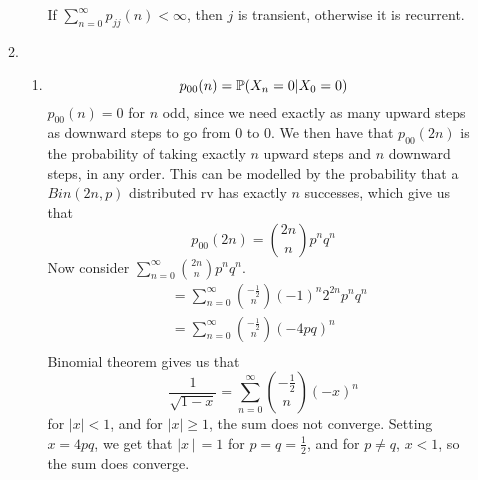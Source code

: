 \documentclass{article}
\begin{document}
\begin{enumerate}
\begin{enumerate}
\begin{enumerate}
If $\sum\limits^\infty_{n=0}p_{jj}(n) < \infty$, then $j$ is transient, otherwise it is recurrent.

\end{enumerate}
\item
\begin{enumerate}
\item
$$
p_{00}(n) = \mathbb{P} (X_n = 0 | X_0 = 0)
$$
$p_{00}(n) = 0$ for $n$ odd, since we need exactly as many upward steps as downward steps to go from $0$ to $0$. We then have that $p_{00}(2n)$ is the probability of taking exactly $n$ upward steps and $n$ downward steps, in any order. This can be modelled by the probability that a $Bin(2n,p)$ distributed rv has exactly $n$ successes, which give us that
$$
p_{00}(2n) = {2n \choose n} p^nq^n
$$
Now consider $\sum\limits^\infty_{n=0}{2n\choose n} p^nq^n$.
\begin{align*}
&= \sum^\infty_{n=0}{-\frac{1}{2}\choose n}(-1)^n 2^{2n} p^n q^n\\
&= \sum^\infty_{n=0}{-\frac{1}{2}\choose n}(-4pq)^n\\
\end{align*}
Binomial theorem gives us that
$$
\frac{1}{\sqrt{1-x}} = \sum^\infty_{n=0}{-\frac{1}{2}\choose n}(-x)^n 
$$
for $|x|<1$, and for $|x|\geqslant 1$, the sum does not converge. Setting $x=4pq$, we get that $|x\!\,|\,=1$ for $p=q=\frac{1}{2}$, and for $p \neq q$, $x<1$, so the sum does converge.


\end{enumerate}
\end{enumerate}
\end{enumerate}
\end{document}
